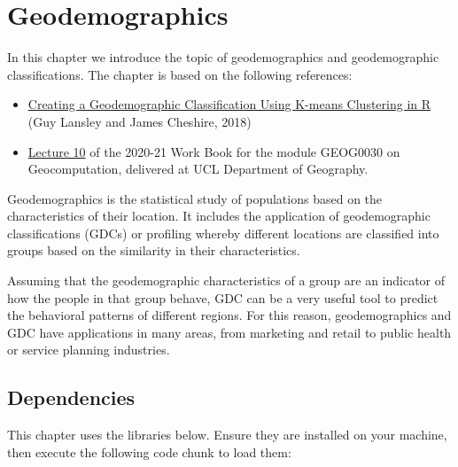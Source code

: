 \documentclass[
  letterpaper,
  DIV=11,
  numbers=noendperiod]{scrreprt}
\begin{document}

\hypertarget{sec-chp3}{%
\chapter{Geodemographics}\label{sec-chp3}}

In this chapter we introduce the topic of geodemographics and
geodemographic classifications. The chapter is based on the following
references:

\begin{itemize}
\item
  \href{https://data.cdrc.ac.uk/dataset/creating-geodemographic-classification-using-k-means-clustering-r}{Creating
  a Geodemographic Classification Using K-means Clustering in R} (Guy
  Lansley and James Cheshire, 2018)
\item
  \href{https://jo-wilkin.github.io/GEOG0030/coursebook/geodemographic-classification.html}{Lecture
  10} of the 2020-21 Work Book for the module GEOG0030 on
  Geocomputation, delivered at UCL Department of Geography.
\end{itemize}

Geodemographics is the statistical study of populations based on the
characteristics of their location. It includes the application of
geodemographic classifications (GDCs) or profiling whereby different
locations are classified into groups based on the similarity in their
characteristics.

Assuming that the geodemographic characteristics of a group are an
indicator of how the people in that group behave, GDC can be a very
useful tool to predict the behavioral patterns of different regions. For
this reason, geodemographics and GDC have applications in many areas,
from marketing and retail to public health or service planning
industries.

\hypertarget{sec-sec31}{%
\section{Dependencies}\label{sec-sec31}}

This chapter uses the libraries below. Ensure they are installed on your
machine, then execute the following code chunk to load them:
\end{document}
